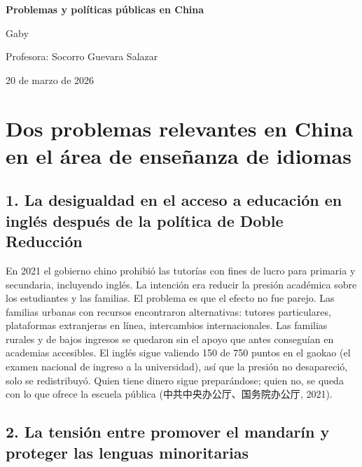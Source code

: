 \documentclass[12pt,a4paper]{article}
\newcommand{\zh}[1]{{\cjkfont #1}}
\begin{document}
\begin{titlepage}
\centering
\vspace*{3cm}

{\LARGE\bfseries Problemas y políticas públicas en China\par}

\vspace{2cm}

{\large Gaby\par}

\vspace{1cm}

{\large Profesora: Socorro Guevara Salazar\par}

\vspace{1cm}

{\large 20 de marzo de 2026\par}

\vfill
\end{titlepage}


\section*{Dos problemas relevantes en China en el área de enseñanza de idiomas}

\subsection*{1. La desigualdad en el acceso a educación en inglés después de la política de Doble Reducción}

En 2021 el gobierno chino prohibió las tutorías con fines de lucro para primaria y secundaria, incluyendo inglés. La intención era reducir la presión académica sobre los estudiantes y las familias. El problema es que el efecto no fue parejo. Las familias urbanas con recursos encontraron alternativas: tutores particulares, plataformas extranjeras en línea, intercambios internacionales. Las familias rurales y de bajos ingresos se quedaron sin el apoyo que antes conseguían en academias accesibles. El inglés sigue valiendo 150 de 750 puntos en el gaokao (el examen nacional de ingreso a la universidad), así que la presión no desapareció, solo se redistribuyó. Quien tiene dinero sigue preparándose; quien no, se queda con lo que ofrece la escuela pública (\zh{中共中央办公厅、国务院办公厅}, 2021).

\subsection*{2. La tensión entre promover el mandarín y proteger las lenguas minoritarias}
\end{document}
